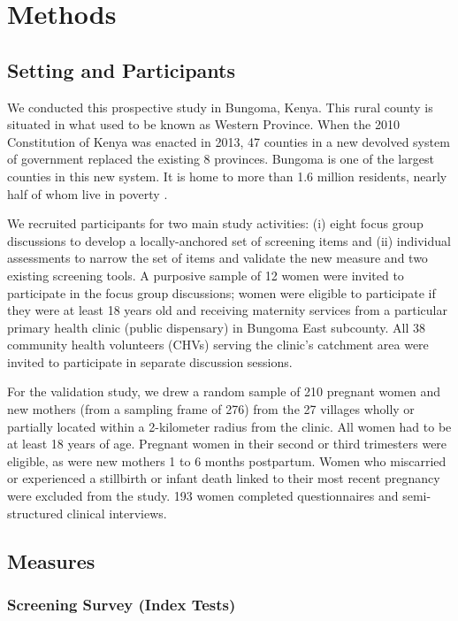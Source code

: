 \documentclass[man,natbib,longtable]{apa6}\usepackage[]{graphicx}\usepackage[]{color}
\begin{document}
\section{Methods}

\subsection{Setting and Participants}

We conducted this prospective study in Bungoma, Kenya. This rural county is situated in what used to be known as Western Province. When the 2010 Constitution of Kenya was enacted in 2013, 47 counties in a new devolved system of government replaced the existing 8 provinces. Bungoma is one of the largest counties in this new system. It is home to more than 1.6 million residents, nearly half of whom live in poverty \citep{Wiesmann:2014}. 

We recruited participants for two main study activities: (i) eight focus group discussions to develop a locally-anchored set of screening items and (ii) individual assessments to narrow the set of items and validate the new measure and two existing screening tools. A purposive sample of 12 women were invited to participate in the focus group discussions; women were eligible to participate if they were at least 18 years old and receiving maternity services from a particular primary health clinic (public dispensary) in Bungoma East subcounty. All 38 community health volunteers (CHVs) serving the clinic's catchment area were invited to participate in separate discussion sessions. 

For the validation study, we drew a random sample of 210 pregnant women and new mothers (from a sampling frame of 276) from the 27 villages wholly or partially located within a 2-kilometer radius from the clinic. All women had to be at least 18 years of age. Pregnant women in their second or third trimesters were eligible, as were new mothers 1 to 6 months postpartum. Women who miscarried or experienced a stillbirth or infant death linked to their most recent pregnancy were excluded from the study. 193 women completed questionnaires and semi-structured clinical interviews.

\subsection{Measures}

\subsubsection{Screening Survey (Index Tests)}
\end{document}
